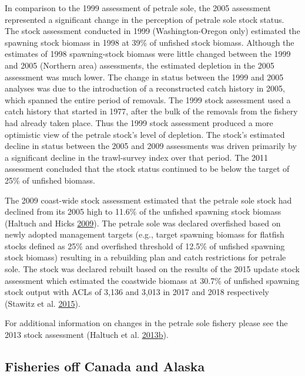 \documentclass[12pt,]{article}
\begin{document}
In comparison to the 1999 assessment of petrale sole, the 2005
assessment represented a significant change in the perception of petrale
sole stock status. The stock assessment conducted in 1999
(Washington-Oregon only) estimated the spawning stock biomass in 1998 at
39\% of unfished stock biomass. Although the estimates of 1998
spawning-stock biomass were little changed between the 1999 and 2005
(Northern area) assessments, the estimated depletion in the 2005
assessment was much lower. The change in status between the 1999 and
2005 analyses was due to the introduction of a reconstructed catch
history in 2005, which spanned the entire period of removals. The 1999
stock assessment used a catch history that started in 1977, after the
bulk of the removals from the fishery had already taken place. Thus the
1999 stock assessment produced a more optimistic view of the petrale
stock's level of depletion. The stock's estimated decline in status
between the 2005 and 2009 assessments was driven primarily by a
significant decline in the trawl-survey index over that period. The 2011
assessment concluded that the stock status continued to be below the
target of 25\% of unfished biomass.

The 2009 coast-wide stock assessment estimated that the petrale sole
stock had declined from its 2005 high to 11.6\% of the unfished spawning
stock biomass (Haltuch and Hicks
\protect\hyperlink{ref-haltuch_status_2009}{2009}). The petrale sole was
declared overfished based on newly adopted management targets (e.g.,
target spawning biomass for flatfish stocks defined as 25\% and
overfished threshold of 12.5\% of unfished spawning stock biomass)
resulting in a rebuilding plan and catch restrictions for petrale sole.
The stock was declared rebuilt based on the results of the 2015 update
stock assessment which estimated the coastwide biomass at 30.7\% of
unfished spawning stock output with ACLs of 3,136 and 3,013 in 2017 and
2018 respectively (Stawitz et al.
\protect\hyperlink{ref-stawitz_stock_2015}{2015}).

For additional information on changes in the petrale sole fishery please
see the 2013 stock assessment (Haltuch et al.
\protect\hyperlink{ref-haltuch_status_2013}{2013}\protect\hyperlink{ref-haltuch_status_2013}{b}).

\subsection{Fisheries off Canada and
Alaska}\label{fisheries-off-canada-and-alaska}
\end{document}
